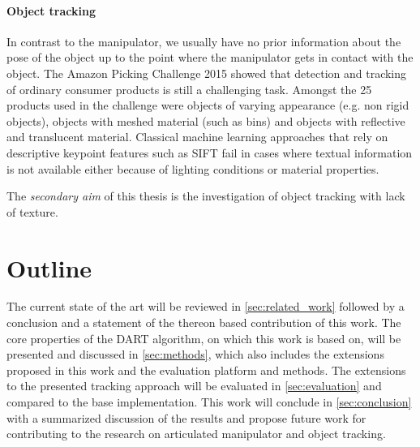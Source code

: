 \paragraph{Object tracking}
In contrast to the manipulator, we usually have no prior information about the pose of the object up to the point where the manipulator gets in contact with the object. The Amazon Picking Challenge 2015 \cite{Correll2016} showed that detection and tracking of ordinary consumer products is still a challenging task. Amongst the 25 products used in the challenge were objects of varying appearance (e.g. non rigid objects), objects with meshed material (such as bins) and objects with reflective and translucent material. Classical machine learning approaches that rely on descriptive keypoint features such as SIFT fail in cases where textual information is not available either because of lighting conditions or material properties.

The \emph{secondary aim} of this thesis is the investigation of object tracking with lack of texture.


\section{Outline}

The current state of the art will be reviewed in \cref{sec:related_work} followed by a conclusion and a statement of the thereon based contribution of this work. The core properties of the DART algorithm, on which this work is based on, will be presented and discussed in \cref{sec:methods}, which also includes the extensions proposed in this work and the evaluation platform and methods. The extensions to the presented tracking approach will be evaluated in \cref{sec:evaluation} and compared to the base implementation. This work will conclude in \cref{sec:conclusion} with a summarized discussion of the results and propose future work for contributing to the research on articulated manipulator and object tracking.
